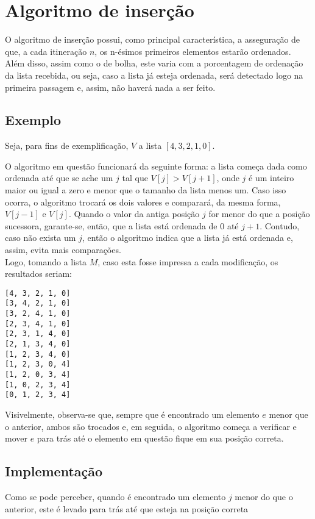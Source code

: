\section{Algoritmo de inserção}
O algoritmo de inserção possui, como principal característica, a asseguração de que, a cada itineração $n$, os n-ésimos primeiros elementos estarão ordenados. Além disso, assim como o de bolha, este varia com a porcentagem de ordenação da lista recebida, ou seja, caso a lista já esteja ordenada, será detectado logo na primeira passagem e, assim, não haverá nada a ser feito. 


\subsection{Exemplo}
Seja, para fins de exemplificação, $V$ a lista $[4,3,2,1,0]$.  

O algoritmo em questão funcionará da seguinte forma: a lista começa dada como ordenada até que se ache um $j$ tal que $V[j]>V[j+1]$, onde $j$ é um inteiro maior ou igual a zero e menor que o tamanho da lista menos um. 
Caso isso ocorra, o algoritmo trocará os dois valores e comparará, da mesma forma, $V[j-1]$ e $V[j]$. Quando o valor da antiga posição $j$ for menor do que a posição sucessora, garante-se, então, que a lista está ordenada de 0 até $j+1$. Contudo, caso não exista um $j$, então o algoritmo indica que a lista já está ordenada e, assim, evita mais comparações.
\\

Logo, tomando a lista $M$, caso esta fosse impressa a cada modificação, os resultados seriam:
\begin{lstlisting}
[4, 3, 2, 1, 0]
[3, 4, 2, 1, 0]
[3, 2, 4, 1, 0]
[2, 3, 4, 1, 0]
[2, 3, 1, 4, 0]
[2, 1, 3, 4, 0]
[1, 2, 3, 4, 0]
[1, 2, 3, 0, 4]
[1, 2, 0, 3, 4]
[1, 0, 2, 3, 4]
[0, 1, 2, 3, 4]
\end{lstlisting}

Visivelmente, observa-se que, sempre que é encontrado um elemento $e$ menor que o anterior, ambos são trocados e, em seguida, o algoritmo começa a verificar e mover $e$ para trás até o elemento em questão fique em sua posição correta.
\newpage

\subsection{Implementação}
Como se pode perceber, quando é encontrado um elemento $j$ menor do que o anterior, este é levado para trás até que esteja na posição correta

